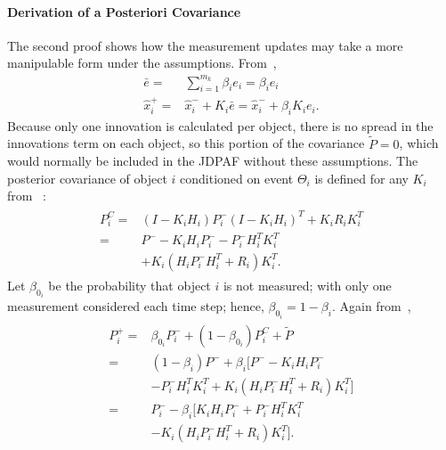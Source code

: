 \documentclass[letterpaper, 10pt, conference]{ieeeconf}
\begin{document}
\begin{appendix}
\paragraph{Derivation of a Posteriori Covariance}

The second proof shows how the measurement updates may take a more manipulable form under the assumptions. From~\cite[Section 6.4]{TrackDataAssoc},
\begin{align}
\bar e=&\displaystyle\sum\limits_{i=1}^{m_k}\beta_ie_i=\beta_ie_i\\
\hat x^+_i=&\hat x^-_i+K_i\bar e=\hat x^-_i+\beta_iK_ie_i.
\end{align}
Because only one innovation is calculated per object, there is no spread in the innovations term on each object, so this portion of the covariance $\tilde{P}=0$, which would normally be included in the JDPAF without these assumptions. The posterior covariance of object $i$ conditioned on event $\Theta_i$ is defined for any $K_i$ from ~\cite[Section 4.2]{OptEst1}:
\begin{align}
\begin{split}
P_{i}^C=&(I-K_{i}H_{i})P_{i}^{-}(I-K_{i}H_{i})^T+K_{i}R_{i}K_{i}^T\\
=&P^--K_{i}H_{i}P_{i}^{-}-P_{i}^{-}H_{i}^TK_{i}^T\\
&+K_{i}(H_{i}P_{i}^{-}H_{i}^T+R_i)K_{i}^T.
\end{split}
\end{align}
Let $\beta_{0_i}$ be the probability that object $i$ is not measured; with only one measurement considered each time step; hence, $\beta_{0_i}=1-\beta_i$. Again from~\cite[Section 6.4]{TrackDataAssoc},
\begin{align}
\begin{split}
P^+_i=&\beta_{0_i}P^-_i+(1-\beta_{0_i})P_i^C+\tilde{P}\\
=&(1-\beta_i)P^-+\beta_i[P^--K_{i}H_{i}P_{i}^{-}\\
&-P_{i}^{-}H_{i}^TK_{i}^T+K_{i}(H_{i}P_{i}^{-}H_{i}^T+R_i)K_{i}^T]\\
=&P^-_i-\beta_i[K_{i}H_{i}P_{i}^{-}+P_{i}^{-}H_{i}^TK_{i}^T\\
&-K_{i}(H_{i}P_{i}^{-}H_{i}^T+R_i)K_{i}^T].
\end{split}
\end{align}

\end{appendix}




\end{document}
